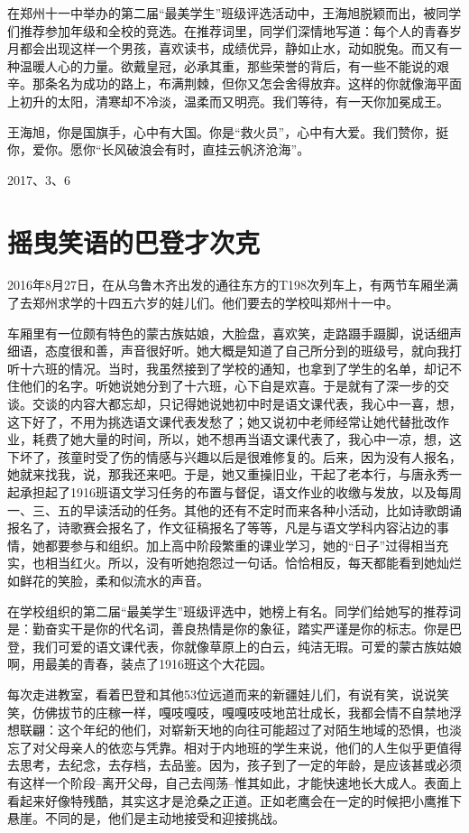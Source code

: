 \documentclass[openany]{ctexbook}
\begin{document}
在郑州十一中举办的第二届``最美学生''班级评选活动中，王海旭脱颖而出，被同学们推荐参加年级和全校的竞选。在推荐词里，同学们深情地写道：每个人的青春岁月都会出现这样一个男孩，喜欢读书，成绩优异，静如止水，动如脱兔。而又有一种温暖人心的力量。欲戴皇冠，必承其重，那些荣誉的背后，有一些不能说的艰辛。那条名为成功的路上，布满荆棘，但你又怎会舍得放弃。这样的你就像海平面上初升的太阳，清寒却不冷淡，温柔而又明亮。我们等待，有一天你加冕成王。

王海旭，你是国旗手，心中有大国。你是``救火员''，心中有大爱。我们赞你，挺你，爱你。愿你``长风破浪会有时，直挂云帆济沧海''。

2017、3、6

\chapter*{摇曳笑语的巴登才次克}\label{badengcaicike}

2016年8月27日，在从乌鲁木齐出发的通往东方的T198次列车上，有两节车厢坐满了去郑州求学的十四五六岁的娃儿们。他们要去的学校叫郑州十一中。

车厢里有一位颇有特色的蒙古族姑娘，大脸盘，喜欢笑，走路蹑手蹑脚，说话细声细语，态度很和善，声音很好听。她大概是知道了自己所分到的班级号，就向我打听十六班的情况。当时，我虽然接到了学校的通知，也拿到了学生的名单，却记不住他们的名字。听她说她分到了十六班，心下自是欢喜。于是就有了深一步的交谈。交谈的内容大都忘却，只记得她说她初中时是语文课代表，我心中一喜，想，这下好了，不用为挑选语文课代表发愁了；她又说初中老师经常让她代替批改作业，耗费了她大量的时间，所以，她不想再当语文课代表了，我心中一凉，想，这下坏了，孩童时受了伤的情感与兴趣以后是很难修复的。后来，因为没有人报名，她就来找我，说，那我还来吧。于是，她又重操旧业，干起了老本行，与唐永秀一起承担起了1916班语文学习任务的布置与督促，语文作业的收缴与发放，以及每周一、三、五的早读活动的任务。其他的还有不定时而来各种小活动，比如诗歌朗诵报名了，诗歌赛会报名了，作文征稿报名了等等，凡是与语文学科内容沾边的事情，她都要参与和组织。加上高中阶段繁重的课业学习，她的``日子''过得相当充实，也相当红火。所以，没有听她抱怨过一句话。恰恰相反，每天都能看到她灿烂如鲜花的笑脸，柔和似流水的声音。

在学校组织的第二届``最美学生''班级评选中，她榜上有名。同学们给她写的推荐词是：勤奋实干是你的代名词，善良热情是你的象征，踏实严谨是你的标志。你是巴登，我们可爱的语文课代表，你就像草原上的白云，纯洁无瑕。可爱的蒙古族姑娘啊，用最美的青春，装点了1916班这个大花园。

每次走进教室，看着巴登和其他53位远道而来的新疆娃儿们，有说有笑，说说笑笑，仿佛拔节的庄稼一样，嘎吱嘎吱，嘎嘎吱吱地茁壮成长，我都会情不自禁地浮想联翩：这个年纪的他们，对崭新天地的向往可能超过了对陌生地域的恐惧，也淡忘了对父母亲人的依恋与凭靠。相对于内地班的学生来说，他们的人生似乎更值得去思考，去纪念，去存档，去品鉴。因为，孩子到了一定的年龄，是应该甚或必须有这样一个阶段--离开父母，自己去闯荡--惟其如此，才能快速地长大成人。表面上看起来好像特残酷，其实这才是沧桑之正道。正如老鹰会在一定的时候把小鹰推下悬崖。不同的是，他们是主动地接受和迎接挑战。
\end{document}
